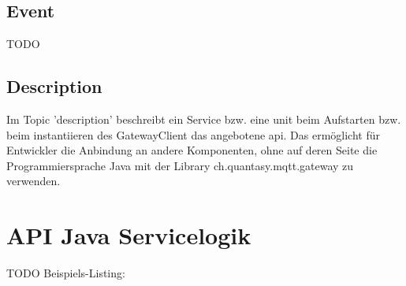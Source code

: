 \subsection{Event}
TODO
\subsection{Description}
Im Topic '\gls{description}' beschreibt ein Service bzw. eine \acrshort{unit} beim Aufstarten bzw. beim instantiieren des GatewayClient das angebotene \acrshort{api}. Das ermöglicht für Entwickler die Anbindung an andere Komponenten, ohne auf deren Seite die Programmiersprache Java mit der Library ch.quantasy.mqtt.gateway\cite{ch.quantasy.mqtt.gateway} zu verwenden.

\section{API Java Servicelogik}

TODO
Beispiels-Listing:


